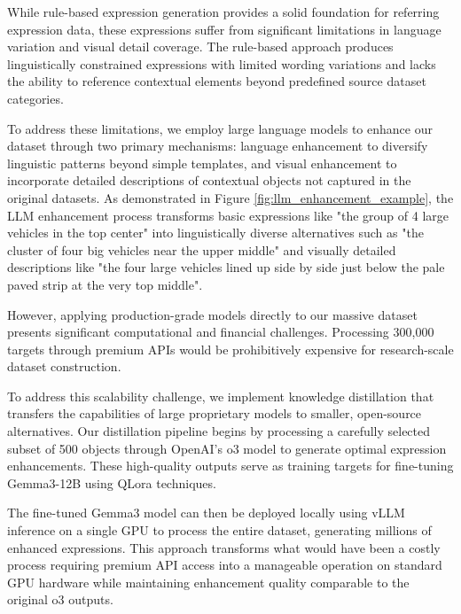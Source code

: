 While rule-based expression generation provides a solid foundation for referring expression data, these expressions suffer from significant limitations in language variation and visual detail coverage. The rule-based approach produces linguistically constrained expressions with limited wording variations and lacks the ability to reference contextual elements beyond predefined source dataset categories.

To address these limitations, we employ large language models to enhance our dataset through two primary mechanisms: language enhancement to diversify linguistic patterns beyond simple templates, and visual enhancement to incorporate detailed descriptions of contextual objects not captured in the original datasets. As demonstrated in Figure \ref{fig:llm_enhancement_example}, the LLM enhancement process transforms basic expressions like "the group of 4 large vehicles in the top center" into linguistically diverse alternatives such as "the cluster of four big vehicles near the upper middle" and visually detailed descriptions like "the four large vehicles lined up side by side just below the pale paved strip at the very top middle".

However, applying production-grade models directly to our massive dataset presents significant computational and financial challenges. Processing 300,000 targets through premium APIs would be prohibitively expensive for research-scale dataset construction.

To address this scalability challenge, we implement knowledge distillation that transfers the capabilities of large proprietary models to smaller, open-source alternatives. Our distillation pipeline begins by processing a carefully selected subset of 500 objects through OpenAI's o3 model to generate optimal expression enhancements. These high-quality outputs serve as training targets for fine-tuning Gemma3-12B using QLora techniques.

The fine-tuned Gemma3 model can then be deployed locally using vLLM inference on a single GPU to process the entire dataset, generating millions of enhanced expressions. This approach transforms what would have been a costly process requiring premium API access into a manageable operation on standard GPU hardware while maintaining enhancement quality comparable to the original o3 outputs.


